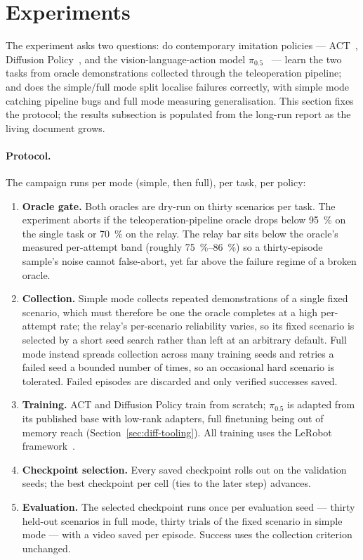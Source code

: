 \section{Experiments}
\label{sec:experiments}

The experiment asks two questions: do contemporary imitation policies
--- ACT~\citep{zhao2023aloha}, Diffusion
Policy~\citep{chi2023diffusion}, and the vision-language-action model
$\pi_{0.5}$~\citep{pi05} --- learn the two tasks from oracle
demonstrations collected through the teleoperation pipeline; and does
the simple/full mode split localise failures correctly, with simple
mode catching pipeline bugs and full mode measuring generalisation.
This section fixes the protocol; the results subsection is populated
from the long-run report as the living document grows.

\paragraph{Protocol.}
The campaign runs per mode (simple, then full), per task, per policy:
\begin{enumerate}
  \item \textbf{Oracle gate.} Both oracles are dry-run on thirty
    scenarios per task. The experiment aborts if the
    teleoperation-pipeline oracle drops below \SI{95}{\percent} on the
    single task or \SI{70}{\percent} on the relay. The relay bar sits
    below the oracle's measured per-attempt band (roughly
    \SIrange{75}{86}{\percent}) so a thirty-episode sample's noise
    cannot false-abort, yet far above the failure regime of a broken
    oracle.
  \item \textbf{Collection.} Simple mode collects repeated demonstrations
    of a single fixed scenario, which must therefore be one the oracle
    completes at a high per-attempt rate; the relay's per-scenario
    reliability varies, so its fixed scenario is selected by a short seed
    search rather than left at an arbitrary default. Full mode instead
    spreads collection across many training seeds and retries a failed
    seed a bounded number of times, so an occasional hard scenario is
    tolerated. Failed episodes are discarded and only verified successes
    saved.
  \item \textbf{Training.} ACT and Diffusion Policy train from scratch;
    $\pi_{0.5}$ is adapted from its published base with low-rank
    adapters, full finetuning being out of memory reach
    (Section~\ref{sec:diff-tooling}). All training uses the
    LeRobot framework~\citep{cadene2024lerobot}.
  \item \textbf{Checkpoint selection.} Every saved checkpoint rolls out
    on the validation seeds; the best checkpoint per cell (ties to the
    later step) advances.
  \item \textbf{Evaluation.} The selected checkpoint runs once per
    evaluation seed --- thirty held-out scenarios in full mode, thirty
    trials of the fixed scenario in simple mode --- with a video saved
    per episode. Success uses the collection criterion unchanged.
\end{enumerate}

